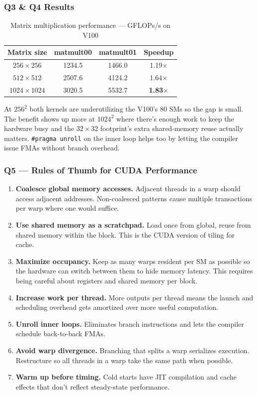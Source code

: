 \documentclass[11pt,letterpaper]{article}
\begin{document}
\subsubsection{Q3 \& Q4 Results}

\begin{table}[H]
\centering
\caption{Matrix multiplication performance --- GFLOPs/s on V100}
\begin{tabular}{cccc}
\toprule
\textbf{Matrix size} & \textbf{matmult00} & \textbf{matmult01} & \textbf{Speedup} \\
\midrule
$256\times256$   & 1234.5  & 1466.0  & 1.19$\times$ \\
$512\times512$   & 2507.6  & 4124.2  & 1.64$\times$ \\
$1024\times1024$ & 3020.5  & 5532.7  & \textbf{1.83}$\times$ \\
\bottomrule
\end{tabular}
\end{table}

At $256^2$ both kernels are underutilizing the V100's 80 SMs so the gap is small.
The benefit shows up more at $1024^2$ where there's enough work to keep the hardware
busy and the $32\times32$ footprint's extra shared-memory reuse actually matters.
\texttt{\#pragma unroll} on the inner loop helps too by letting the compiler issue
FMAs without branch overhead.

\subsubsection{Q5 --- Rules of Thumb for CUDA Performance}

\begin{enumerate}
  \item \textbf{Coalesce global memory accesses.} Adjacent threads in a warp should
        access adjacent addresses. Non-coalesced patterns cause multiple transactions
        per warp where one would suffice.
  \item \textbf{Use shared memory as a scratchpad.} Load once from global, reuse from
        shared memory within the block. This is the CUDA version of tiling for cache.
  \item \textbf{Maximize occupancy.} Keep as many warps resident per SM as possible
        so the hardware can switch between them to hide memory latency. This requires
        being careful about registers and shared memory per block.
  \item \textbf{Increase work per thread.} More outputs per thread means the launch
        and scheduling overhead gets amortized over more useful computation.
  \item \textbf{Unroll inner loops.} Eliminates branch instructions and lets the
        compiler schedule back-to-back FMAs.
  \item \textbf{Avoid warp divergence.} Branching that splits a warp serializes
        execution. Restructure so all threads in a warp take the same path when
        possible.
  \item \textbf{Warm up before timing.} Cold starts have JIT compilation and cache
        effects that don't reflect steady-state performance.
\end{enumerate}
\end{document}
